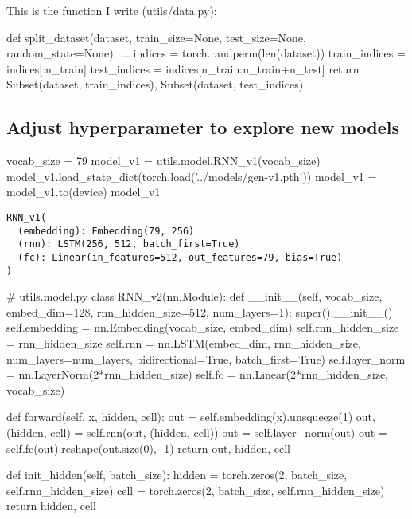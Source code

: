 This is the function I write (utils/data.py):
\begin{pythoncode}
def split_dataset(dataset, train_size=None, test_size=None, random_state=None):
    ...
    indices = torch.randperm(len(dataset))
    train_indices = indices[:n_train]
    test_indices = indices[n_train:n_train+n_test]
    return Subset(dataset, train_indices), Subset(dataset, test_indices)
\end{pythoncode}

\subsection{Adjust hyperparameter to explore new models}



\begin{pythoncode}
vocab_size = 79
model_v1 = utils.model.RNN_v1(vocab_size)
model_v1.load_state_dict(torch.load('../models/gen-v1.pth'))
model_v1 = model_v1.to(device)
model_v1
\end{pythoncode}

\begin{verbatim}
RNN_v1(
  (embedding): Embedding(79, 256)
  (rnn): LSTM(256, 512, batch_first=True)
  (fc): Linear(in_features=512, out_features=79, bias=True)
)
\end{verbatim}


\begin{pythoncode}
# utils.model.py
class RNN_v2(nn.Module):
    def __init__(self, vocab_size, embed_dim=128, rnn_hidden_size=512, num_layers=1):
        super().__init__()
        self.embedding = nn.Embedding(vocab_size, embed_dim)
        self.rnn_hidden_size = rnn_hidden_size
        self.rnn = nn.LSTM(embed_dim, rnn_hidden_size, num_layers=num_layers, bidirectional=True, batch_first=True)
        self.layer_norm = nn.LayerNorm(2*rnn_hidden_size)
        self.fc = nn.Linear(2*rnn_hidden_size, vocab_size)

    def forward(self, x, hidden, cell):
        out = self.embedding(x).unsqueeze(1)
        out, (hidden, cell) = self.rnn(out, (hidden, cell))
        out = self.layer_norm(out)
        out = self.fc(out).reshape(out.size(0), -1)
        return out, hidden, cell

    def init_hidden(self, batch_size):
        hidden = torch.zeros(2, batch_size, self.rnn_hidden_size)
        cell = torch.zeros(2, batch_size, self.rnn_hidden_size)
        return hidden, cell
\end{pythoncode}

